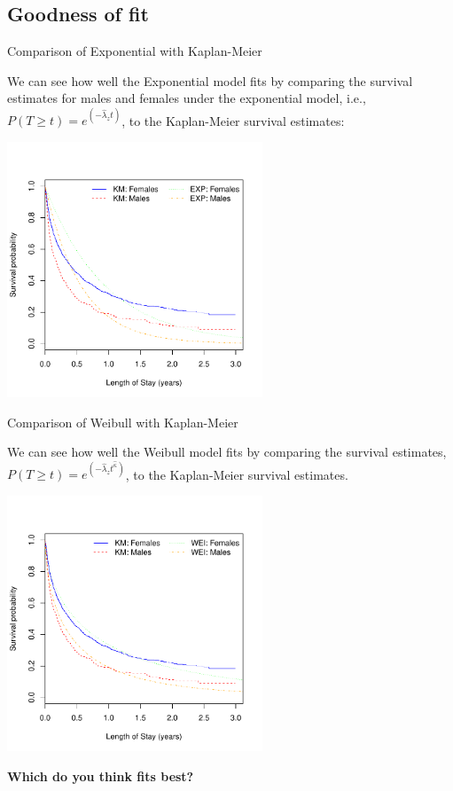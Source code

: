 \documentclass[envcountsect, 10pt, portrait, palatino]{beamer}
\begin{document}
\subsection{Goodness of fit}
\begin{frame}{Comparison of Exponential with Kaplan-Meier}

We can see how well the Exponential model fits by comparing
the survival estimates for males and females under the exponential
model, i.e., $P(T\ge t)=e^{(-\hat\lambda_z t)}$, to the Kaplan-Meier
survival estimates:
\\[-6ex]
\centerline{\includegraphics[width=3in]{ch12exp.pdf}}
\end{frame} 
\begin{frame}{ Comparison of Weibull with Kaplan-Meier}

We can see how well the Weibull model fits by comparing
the survival estimates, $P(T\ge t)=e^{(-\hat\lambda_z t^{\hat\kappa})}$,
to the Kaplan-Meier survival estimates.\\[-4ex]
\centerline{\includegraphics[width=3in]{ch12weib.pdf}}
{\bf Which do you think fits best?}
\end{frame} 
\end{document}
